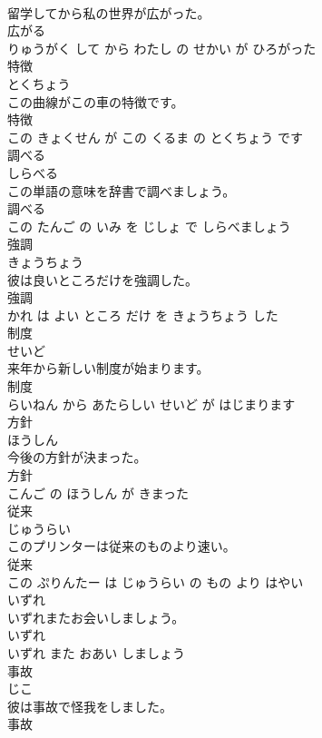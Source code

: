 \documentclass[8pt]{extreport}
\begin{document}
\begin{CJK}{UTF8}{min}
\\	留学してから私の世界が広がった。	
\\	広がる 
\\	りゅうがく して から わたし の せかい が ひろがった			
\\	特徴	
\\	とくちょう			
\\	この曲線がこの車の特徴です。	
\\	特徴 
\\	この きょくせん が この くるま の とくちょう です			
\\	調べる	
\\	しらべる			
\\	この単語の意味を辞書で調べましょう。	
\\	調べる 
\\	この たんご の いみ を じしょ で しらべましょう			
\\	強調	
\\	きょうちょう			
\\	彼は良いところだけを強調した。	
\\	強調 
\\	かれ は よい ところ だけ を きょうちょう した			
\\	制度	
\\	せいど			
\\	来年から新しい制度が始まります。	
\\	制度 
\\	らいねん から あたらしい せいど が はじまります			
\\	方針	
\\	ほうしん			
\\	今後の方針が決まった。	
\\	方針 
\\	こんご の ほうしん が きまった			
\\	従来	
\\	じゅうらい			
\\	このプリンターは従来のものより速い。	
\\	従来 
\\	この ぷりんたー は じゅうらい の もの より はやい			
\\	いずれ	
\\	いずれまたお会いしましょう。	
\\	いずれ 
\\	いずれ また おあい しましょう			
\\	事故	
\\	じこ			
\\	彼は事故で怪我をしました。	
\\	事故 

\end{CJK}
\end{document}
